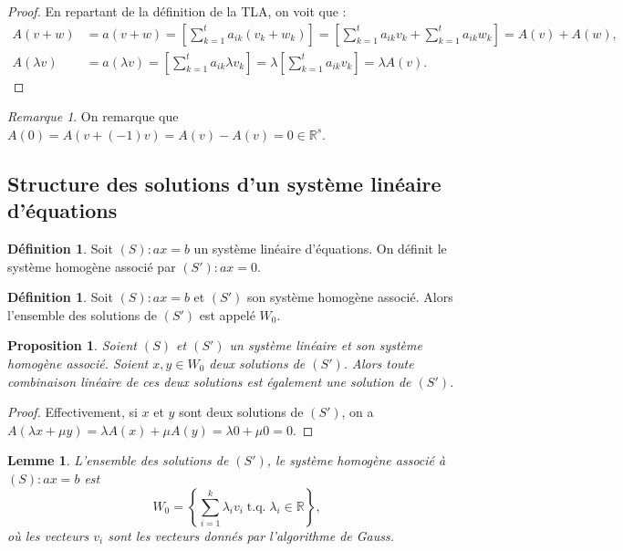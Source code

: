 \documentclass{article}
\DeclareMathOperator{\tq}{\text{ t.q. }}
\newcommand{\R}{\mathbb R}
\newtheorem{prp}[thm]{Proposition}
\newtheorem{lem}[thm]{Lemme}
\theoremstyle{definition}
\newtheorem{déf}[thm]{Définition}
\theoremstyle{remark}
\newtheorem*{rmq}{Remarque}
\begin{document}
		\begin{proof} En repartant de la définition de la TLA, on voit que :
		\begin{align*}
			A(v+w) &= a(v+w) = \left[\sum_{k=1}^ta_{ik}(v_k+w_k)\right] = \left[\sum_{k=1}^ta_{ik}v_k+\sum_{k=1}^ta_{ik}w_k\right] = A(v) + A(w), \\
			A(\lambda v) &= a(\lambda v) = \left[\sum_{k=1}^ta_{ik}\lambda v_k\right] = \lambda \left[\sum_{k=1}^ta_{ik}v_k\right] = \lambda A(v).
		\end{align*}
		\end{proof}

		\begin{rmq} On remarque que $A(0) = A(v + (-1)v) = A(v) - A(v) = 0 \in \R^s$. \end{rmq}
	
	\subsection{Structure des solutions d'un système linéaire d'équations}
		\begin{déf} Soit $(S) : ax = b$ un système linéaire d'équations. On définit le système homogène associé par $(S') : ax = 0$. \end{déf}

		\begin{déf} Soit $(S) : ax = b$ et $(S')$ son système homogène associé. Alors l'ensemble des solutions de $(S')$ est appelé $W_0$. \end{déf}

		\begin{prp}\label{combiliW0} Soient $(S)$ et $(S')$ un système linéaire et son système homogène associé. Soient $x, y \in W_0$ deux solutions de $(S')$. Alors
		toute combinaison linéaire de ces deux solutions est également une solution de $(S')$. \end{prp}

		\begin{proof} Effectivement, si $x$ et $y$ sont deux solutions de $(S')$, on a $A(\lambda x + \mu y) = \lambda A(x) + \mu A(y) = \lambda 0 + \mu 0 = 0$. \end{proof}

		\begin{lem} L'ensemble des solutions de $(S')$, le système homogène associé à $(S) : ax = b$ est \[W_0 = \left\{\sum_{i=1}^k\lambda_i v_i \tq \lambda_i \in \R\right\},\]
		où les vecteurs $v_i$ sont les vecteurs donnés par l'algorithme de Gauss. \end{lem}
\end{document}
